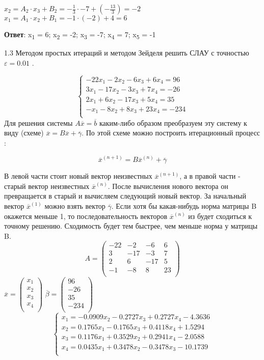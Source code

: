 \documentclass[10pt, a4paper]{scrartcl}
\begin{document}
\(\displaystyle x_2 = A_2\cdot x_3 + B_2 = -\frac{1}{3}\cdot-7 + (-\frac{13}{3}) = -2\)
\(\displaystyle x_1 = A_1\cdot x_2 + B_1 = -1\cdot(-2) + 4 = 6\)

\textbf{Ответ}: x\textsubscript{1} = 6; x\textsubscript{2} = -2;
x\textsubscript{3} = -7; x\textsubscript{4} = 7; x\textsubscript{5} = -1

\pagebreak

1.3 Методом простых итераций и методом Зейделя решить СЛАУ с точностью
\(\varepsilon = 0.01\) .

\[\begin{cases}
-22x_1 - 2x_2 - 6x_3 + 6x_4 = 96\\
3x_1 - 17x_2 - 3x_3 + 7x_4 = -26\\
2x_1 + 6x_2 - 17x_3 + 5x_4 = 35\\
-x_1 - 8x_2 + 8x_3 + 23x_4 = -234\\
\end{cases}\] Для решения системы \(A\overline{x} = \overline{b}\)
каким-либо образом преобразуем эту систему к виду (схеме)
\(\overline{x} = B\overline{x} + \overline{\gamma}\). По этой схеме
можно построить итерационный процесс :

\[\overline{x}^{(n+1)} = B \overline{x}^{(n)} + \overline{\gamma}\]

В левой части стоит новый вектор неизвестных \(\overline{x}^{(n+1)}\), а
в правой части - старый вектор неизвестных \(\overline{x}^{(n)}\). После
вычисления нового вектора он превращается в старый и вычисляем следующий
новый вектор. За начальный вектор \(\overline{x}^{(1)}\) можно взять
вектор \(\overline{\gamma}\). Если хотя бы какая-нибудь норма матрицы B
окажется меньше 1, то последовательность векторов \(\overline{x}^{(n)}\)
из будет сходиться к точному решению. Сходимость будет тем быстрее, чем
меньше норма у матрицы B. \[A = \begin{pmatrix} 
-22 & -2 & -6 & 6\\
3 & -17 & -3 & 7\\
2 & 6 & -17 & 5\\
-1 & -8 & 8 & 23\\
\end{pmatrix}\]
\(\displaystyle \overline{x} = \begin{pmatrix} x_1\\ x_2\\ x_3\\ x_4\\ \end{pmatrix}\)
\(\displaystyle \overline{\beta} = \begin{pmatrix} 96\\ -26\\ 35\\ -234\\ \end{pmatrix}\)
\[\begin{cases}
x_1 = -0.0909x_2 - 0.2727x_3 + 0.2727x_4 - 4.3636\\
x_2 = 0.1765x_1 - 0.1765x_3 + 0.4118x_4 + 1.5294\\
x_3 = 0.1176x_1 + 0.3529x_2 + 0.2941x_4 - 2.0588\\
x_4 = 0.0435x_1 + 0.3478x_2 - 0.3478x_3 - 10.1739\\
\end{cases}\]
\end{document}
